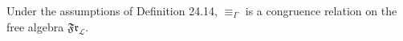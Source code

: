 Under the assumptions of Definition 24.14, $\equiv_\Gamma$ is a congruence relation on the free algebra $\mathfrak{Fr}_\mathcal{L}$.
